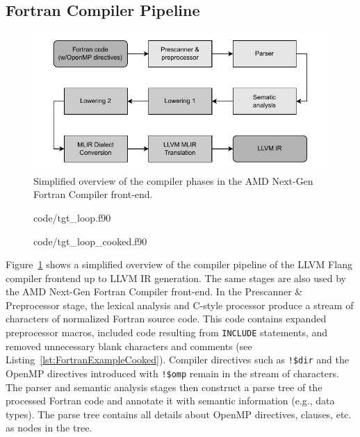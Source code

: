 \documentclass[acmtog,natbib=false]{acmart}
\newcommand{\code}[1]{\texttt{#1}\xspace}
\begin{document}
\subsection{Fortran Compiler Pipeline}
\label{sec:FortranCompilerPipeline}

\begin{figure}[t]
\centering
\includegraphics[width=\linewidth]{figures/flang_compiler_phases_overview.pdf}
\caption{Simplified overview of the compiler phases in the AMD Next-Gen Fortran Compiler front-end.\label{fig:FlangCompilerPhases}}
\end{figure}

\begin{figure}[t]

                {code/tgt_loop.f90}
\end{figure}

\begin{figure}[t]

                {code/tgt_loop_cooked.f90}
\end{figure}

Figure~\ref{fig:FlangCompilerPhases} shows a simplified overview of the compiler pipeline of the LLVM Flang compiler frontend up to LLVM \ac{IR} generation.
The same stages are also used by the AMD Next-Gen Fortran Compiler front-end.
In the Prescanner \& Preprocessor stage, the lexical analysis and C-style processor produce a stream of characters of normalized Fortran source code. 
This code contains expanded preprocessor macros, included code resulting from \code{INCLUDE} statements, and removed unnecessary blank characters and comments (see Listing~\ref{lst:FortranExampleCooked}).
Compiler directives such as \code{!\$dir} and the OpenMP directives introduced with \code{!\$omp} remain in the stream of characters.
The parser and semantic analysis stages then construct a parse tree of the processed Fortran code and annotate it with semantic information (e.g., data types).
The parse tree contains all details about OpenMP directives, clauses, etc. as nodes in the tree.
\end{document}
